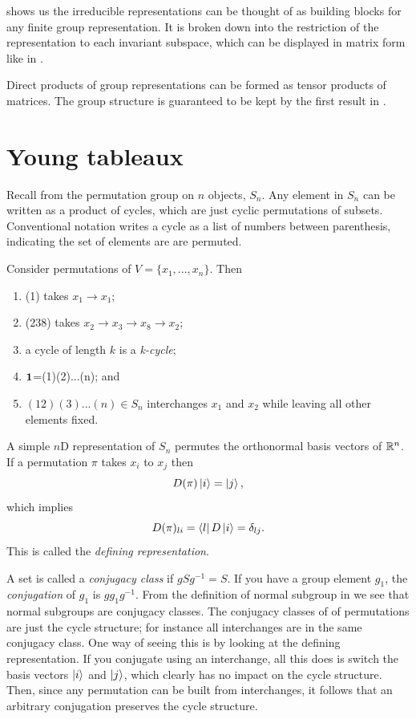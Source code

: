  shows us the irreducible
representations can be thought of as building blocks for any
finite group representation. It is broken down into the restriction
of the representation to each invariant subspace, which 
can be displayed in matrix form like in .

Direct products of group representations can be formed as
tensor products of matrices. The group structure is guaranteed
to be kept by the first result in .


\section{Young tableaux}

Recall from  the permutation group on
$n$ objects, $S_n$. Any element in $S_n$ can be written
as a product of cycles, which are just cyclic permutations of subsets.
Conventional notation writes a cycle as a list of numbers between
parenthesis, indicating the set of elements are are permuted.
\begin{example*}{}{}
  Consider permutations of $V=\{x_1,...,x_n\}$. Then
  \begin{enumerate}
    \item (1) takes $x_1\to x_1$;
    \item (238) takes $x_2\to x_3\to x_8\to x_2$;
    \item a cycle of length $k$ is a {\it k-cycle};
    \item ${\mathbf 1}$=(1)(2)...(n); and
    \item $(12)(3)...(n)\in S_n$ interchanges $x_1$ and $x_2$
          while leaving all other elements fixed.
  \end{enumerate}
\end{example*}
A simple $n$D representation of $S_n$ permutes the orthonormal
basis vectors of $\mathbb{R}^n$. If a permutation $\pi$ takes $x_i$
to $x_j$ then
\begin{equation}
  D(\pi)\ket{i}=\ket{j},
\end{equation}
which implies
\begin{equation}
  D(\pi)_{li}=\bra{l}D\ket{i}=\delta_{lj}.
\end{equation}
This is called the {\it defining representation}.

A set is called a {\it conjugacy class} if 
$gSg^{-1}=S$. If you have a group element $g_1$, the 
{\it conjugation} of $g_1$ is $gg_1g^{-1}$.
From the definition of normal subgroup in  we
see that normal subgroups are conjugacy classes. The conjugacy classes
of of permutations are just the cycle structure; for instance all
interchanges are in the same conjugacy class. One way of seeing this
is by looking at the defining representation. If you conjugate using
an interchange, all this does is switch the basis vectors
$\ket{i}$ and $\ket{j}$, which clearly has no impact on the cycle
structure. Then, since any permutation can be built from interchanges,
it follows that an arbitrary conjugation preserves the cycle
structure. 

